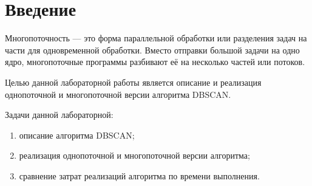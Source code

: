 \chapter*{Введение}

Многопоточность --- это форма параллельной обработки или разделения задач на части для одновременной обработки. Вместо отправки большой задачи на одно ядро, многопоточные программы разбивают её на несколько частей или потоков.

Целью данной лабораторной работы является описание и реализация однопоточной и многопоточной версии алгоритма DBSCAN.

Задачи данной лабораторной:
\begin{enumerate}
	\item описание алгоритма DBSCAN;
	\item реализация однопоточной и многопоточной версии алгоритма;
	\item сравнение затрат реализаций алгоритма по времени выполнения.
\end{enumerate}
